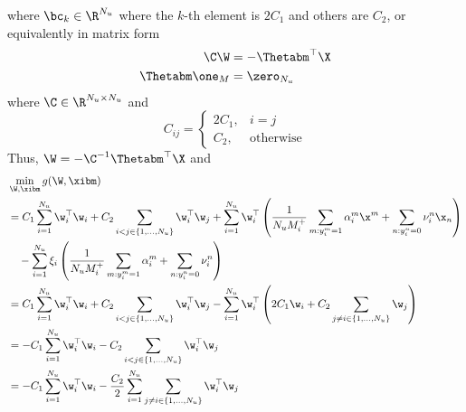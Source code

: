 where $\bc_k \in \R^{N_u}$ where the $k$-th element is $2C_1$ and others are $C_2$,
or equivalently in matrix form
\begin{equation}
\label{eq:wxi}
\begin{aligned}
\C \W &= -\Thetabm^\top \X \\
\Thetabm \one_M &= \zero_{N_u}
\end{aligned}
\end{equation}
where $\C \in \R^{N_u \times N_u}$ and
\begin{equation*}
C_{ij} = \begin{cases}
2C_1, & i = j \\
C_2,  & \mathrm{otherwise}
\end{cases}
\end{equation*}
Thus, $\W = -\C^{-1} \Thetabm^\top \X$ and
\begin{equation*}
\begin{aligned}
&\min_{\W, \xibm} g(\W, \xibm) \\
&= C_1 \sum_{i=1}^{N_u} \w_i^\top \w_i + C_2 \sum_{i < j \in \{1,\dots,N_u\}} \w_i^\top \w_j
   + \sum_{i = 1}^{N_u} \w_i^\top \left( \frac{1}{N_u M_i^+} \sum_{m: y_i^m = 1} \alpha_i^m \x^m + \sum_{n: y_i^n = 0} \nu_i^n \x_n \right) \\
& \quad - \sum_{i = 1}^{N_u} \xi_i \left( \frac{1}{N_u M_i^+} \sum_{m: y_i^m = 1} \alpha_i^m + \sum_{n: y_i^n = 0} \nu_i^n \right) \\
&= C_1 \sum_{i=1}^{N_u} \w_i^\top \w_i + C_2 \sum_{i < j \in \{1,\dots,N_u\}} \w_i^\top \w_j 
   - \sum_{i = 1}^{N_u} \w_i^\top \left( 2C_1 \w_i + C_2 \sum_{j\ne i \in \{1,\dots,N_u\}} \w_j \right) \\
&= - C_1 \sum_{i=1}^{N_u} \w_i^\top \w_i - C_2 \sum_{i < j \in \{1,\dots,N_u\}} \w_i^\top \w_j \\
&= - C_1 \sum_{i=1}^{N_u} \w_i^\top \w_i - \frac{C_2}{2} \sum_{i=1}^{N_u} \sum_{j \ne i \in \{1,\dots,N_u\}} \w_i^\top \w_j \\

\end{aligned}
\end{equation*}
